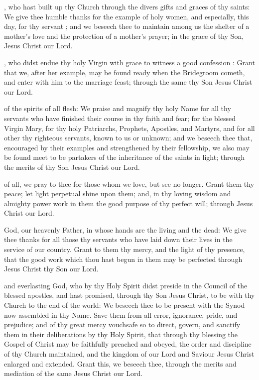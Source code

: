 , who hast built up thy Church through the divers gifts and graces of thy saints: We give thee humble thanks for the example of holy women, and especially, this day, for thy servant ; and we beseech thee to maintain among us the shelter of a mother's love and the protection of a mother's prayer; in the grace of thy Son, Jesus Christ our Lord.

, who didst endue thy holy Virgin  with grace to witness a good confession : Grant that we, after her example, may be found ready when the Bridegroom cometh, and enter with him to the marriage feast; through the same thy Son Jesus Christ our Lord.

 of the spirits of all flesh: We praise and magnify thy holy Name for all thy servants who have finished their course in thy faith and fear; for the blessed Virgin Mary, for thy holy Patriarchs, Prophets, Apostles, and Martyrs, and for all other thy righteous servants, known to us or unknown; and we beseech thee that, encouraged by their examples and strengthened by their fellowship, we also may be found meet to be partakers of the inheritance of the saints in light; through the merits of thy Son Jesus Christ our Lord.

 of all, we pray to thee for those whom we love, but see no longer. Grant them thy peace; let light perpetual shine upon them; and, in thy loving wisdom and almighty power work in them the good purpose of thy perfect will; through Jesus Christ our Lord.

 God, our heavenly Father, in whose hands are the living and the dead: We give thee thanks for all those thy servants who have laid down their lives in the service of our country. Grant to them thy mercy, and the light of thy presence, that the good work which thou hast begun in them may be perfected through Jesus Christ thy Son our Lord.

 and everlasting God, who by thy Holy Spirit didst preside in the Council of the blessed apostles, and hast promised, through thy Son Jesus Christ, to be with thy Church to the end of the world: We beseech thee to be present with the Synod now  assembled in thy Name. Save them from all error, ignorance, pride, and prejudice; and of thy great mercy vouchsafe so to direct, govern, and sanctify them in their deliberations by thy Holy Spirit, that through thy blessing the Gospel of Christ may be faithfully preached and obeyed, the order and discipline of thy Church maintained, and the kingdom of our Lord and Saviour Jesus Christ enlarged and extended. Grant this, we beseech thee, through the merits and mediation of the same Jesus Christ our Lord.

